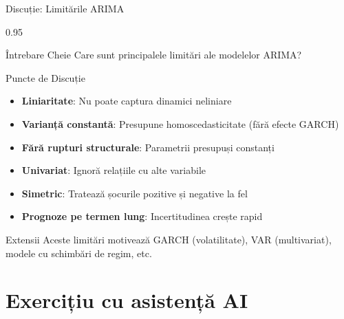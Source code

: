 \documentclass[9pt, aspectratio=169, t]{beamer}
\begin{document}
\begin{frame}{Discuție: Limitările ARIMA}
    \begin{cminipage}{0.95\textwidth}
    \begin{block}{Întrebare Cheie}
        Care sunt principalele limitări ale modelelor ARIMA?
    \end{block}
    \vspace{-1mm}
    \begin{block}{Puncte de Discuție}
        \begin{itemize}\setlength{\itemsep}{0pt}
            \item \textbf{Liniaritate}: Nu poate captura dinamici neliniare
            \item \textbf{Varianță constantă}: Presupune homoscedasticitate (fără efecte GARCH)
            \item \textbf{Fără rupturi structurale}: Parametrii presupuși constanți
            \item \textbf{Univariat}: Ignoră relațiile cu alte variabile
            \item \textbf{Simetric}: Tratează șocurile pozitive și negative la fel
            \item \textbf{Prognoze pe termen lung}: Incertitudinea crește rapid
        \end{itemize}
    \end{block}
    \vspace{-1mm}
    \begin{alertblock}{Extensii}
        Aceste limitări motivează GARCH (volatilitate), VAR (multivariat), modele cu schimbări de regim, etc.
    \end{alertblock}
    \end{cminipage}
\end{frame}

\section{Exercițiu cu asistență AI}
\end{document}
